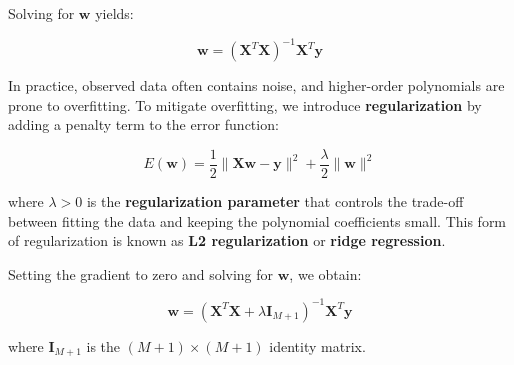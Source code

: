 Solving for $\mathbf{w}$ yields:

\[
    \mathbf{w} = (\mathbf{X}^T\mathbf{X})^{-1}\mathbf{X}^{T}\mathbf{y} \tag{2.5}
\]

In practice, observed data often contains noise, and higher-order polynomials are prone to overfitting.
To mitigate overfitting, we introduce \textbf{regularization} by adding a penalty term to the error function:

\[
    E(\mathbf{w}) = \frac{1}{2} \|\mathbf{Xw} - \mathbf{y}\|^2 + \frac{\lambda}{2}\|\mathbf{w}\|^2 \tag{2.6}
\]

where $\lambda > 0$ is the \textbf{regularization parameter} that controls the trade-off between fitting the data and keeping the polynomial coefficients small.
This form of regularization is known as \textbf{L2 regularization} or \textbf{ridge regression}.

Setting the gradient to zero and solving for $\mathbf{w}$, we obtain:

\[
    \mathbf{w} = (\mathbf{X}^T\mathbf{X} + \lambda\mathbf{I}_{M+1})^{-1}\mathbf{X}^T\mathbf{y} \tag{2.7}
\]

where $\mathbf{I}_{M+1}$ is the $(M+1) \times (M+1)$ identity matrix.